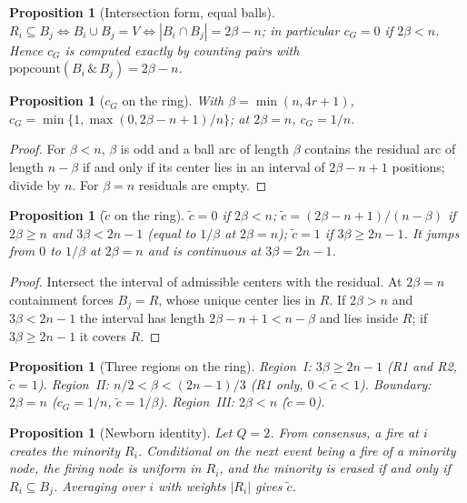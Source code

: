 \documentclass[aps,pre,onecolumn,superscriptaddress,amsmath,amssymb,longbibliography]{revtex4-2}
\newtheorem{proposition}[theorem]{Proposition}
\theoremstyle{definition}
\theoremstyle{remark}
\newcommand{\ctil}{\tilde c}
\newcommand{\cG}{c_G}
\begin{document}
\begin{proposition}[Intersection form, equal balls]
\label{prop:D4}
$R_i\subseteq B_j\iff B_i\cup B_j=V\iff|B_i\cap B_j|=2\beta-n$; in
particular $\cG=0$ if $2\beta<n$. Hence $\cG$ is computed exactly by
counting pairs with $\mathrm{popcount}(B_i\,\&\,B_j)=2\beta-n$.
\end{proposition}

\begin{proposition}[$\cG$ on the ring]
\label{prop:E1}
With $\beta=\min(n,4r+1)$, $\cG=\min\{1,\max(0,2\beta-n+1)/n\}$; at
$2\beta=n$, $\cG=1/n$.
\end{proposition}
\begin{proof}
For $\beta<n$, $\beta$ is odd and a ball arc of length $\beta$ contains
the residual arc of length $n-\beta$ if and only if its center lies in an
interval of $2\beta-n+1$ positions; divide by $n$. For $\beta=n$
residuals are empty.
\end{proof}

\begin{proposition}[$\ctil$ on the ring]
\label{prop:E2}
$\ctil=0$ if $2\beta<n$; $\ctil=(2\beta-n+1)/(n-\beta)$ if $2\beta\ge n$
and $3\beta<2n-1$ (equal to $1/\beta$ at $2\beta=n$); $\ctil=1$ if
$3\beta\ge2n-1$. It jumps from $0$ to $1/\beta$ at $2\beta=n$ and is
continuous at $3\beta=2n-1$.
\end{proposition}
\begin{proof}
Intersect the interval of admissible centers with the residual. At
$2\beta=n$ containment forces $B_j=R$, whose unique center lies in $R$.
If $2\beta>n$ and $3\beta<2n-1$ the interval has length
$2\beta-n+1<n-\beta$ and lies inside $R$; if $3\beta\ge2n-1$ it covers
$R$.
\end{proof}

\begin{proposition}[Three regions on the ring]
\label{prop:E3}
Region~I: $3\beta\ge2n-1$ (R1 and R2, $\ctil=1$). Region~II:
$n/2<\beta<(2n-1)/3$ (R1 only, $0<\ctil<1$). Boundary: $2\beta=n$
($\cG=1/n$, $\ctil=1/\beta$). Region~III: $2\beta<n$ ($\ctil=0$).
\end{proposition}

\begin{proposition}[Newborn identity]
\label{prop:newborn}
Let $Q=2$. From consensus, a fire at $i$ creates the minority $R_i$.
Conditional on the next event being a fire of a minority node, the
firing node is uniform in $R_i$, and the minority is erased if and only
if $R_i\subseteq B_j$. Averaging over $i$ with weights $|R_i|$ gives
$\ctil$.
\end{proposition}
\end{document}
